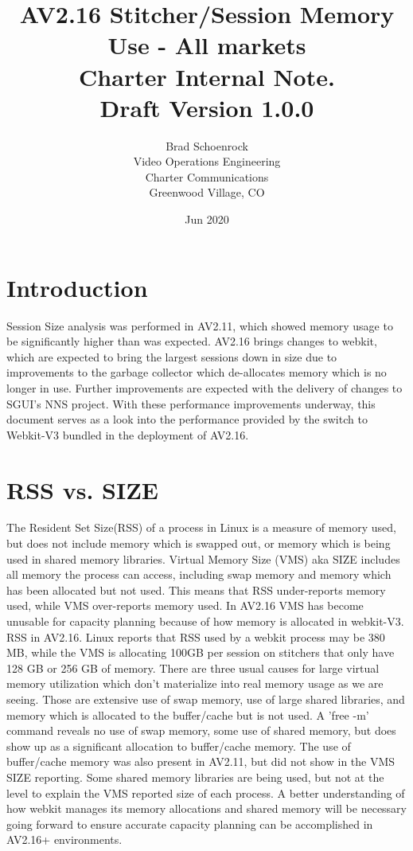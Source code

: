 \documentclass{article}
\author{Brad Schoenrock\\Video Operations Engineering\\Charter Communications\\Greenwood Village, CO}
\title{AV2.16 Stitcher/Session Memory Use - All markets\\Charter Internal Note.\\Draft Version 1.0.0}
\date{Jun 2020}
\begin{document}
\maketitle
\newpage

\tableofcontents
\newpage



\section{Introduction}
\label{SECTION-Introduction}

Session Size analysis was performed in AV2.11, which showed memory usage to be significantly higher than was expected. AV2.16 brings changes to webkit, which are expected to bring the largest sessions down in size due to improvements to the garbage collector which de-allocates memory which is no longer in use. Further improvements are expected with the delivery of changes to SGUI's NNS project. With these performance improvements underway, this document serves as a look into the performance provided by the switch to Webkit-V3 bundled in the deployment of AV2.16. 



\section{RSS vs. SIZE}
\label{SECTION-RSS}

The Resident Set Size(RSS) of a process in Linux is a measure of memory used, but does not include memory which is swapped out, or memory which is being used in shared memory libraries. Virtual Memory Size (VMS) aka SIZE includes all memory the process can access, including swap memory and memory which has been allocated but not used. This means that RSS under-reports memory used, while VMS over-reports memory used. In AV2.16 VMS has become unusable for capacity planning because of how memory is allocated in webkit-V3. RSS in AV2.16. Linux reports that RSS used by a webkit process may be 380 MB, while the VMS is allocating 100GB per session on stitchers that only have 128 GB or 256 GB of memory. There are three usual causes for large virtual memory utilization which don't materialize into real memory usage as we are seeing. Those are extensive use of swap memory, use of large shared libraries, and memory which is allocated to the buffer/cache but is not used. A 'free -m' command reveals no use of swap memory, some use of shared memory, but does show up as a significant allocation to buffer/cache memory. The use of buffer/cache memory was also present in AV2.11, but did not show in the VMS SIZE reporting. Some shared memory libraries are being used, but not at the level to explain the VMS reported size of each process. A better understanding of how webkit manages its memory allocations and shared memory will be necessary going forward to ensure accurate capacity planning can be accomplished in AV2.16+ environments. 
\end{document}
